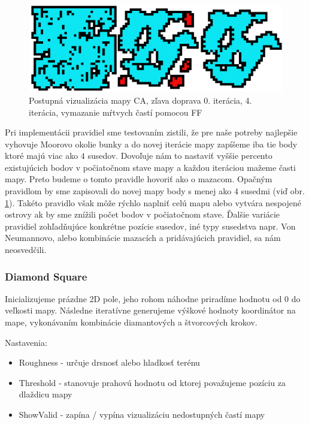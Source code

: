 \begin{figure} [b]
    \centering
    \includegraphics[width=0.75\linewidth]{obrazky-figures/ca.png}
    \caption{Postupná vizualizácia mapy CA, zľava doprava 0. iterácia, 4. iterácia, vymazanie mŕtvych častí pomocou FF}
    \label{fig:ca}
\end{figure}

Pri implementácii pravidiel sme testovaním zistili, že pre naše potreby najlepšie vyhovuje Moorovo okolie bunky a do novej iterácie mapy zapíšeme iba tie body ktoré majú viac ako $4$ susedov. Dovoľuje nám to nastaviť vyššie percento existujúcich bodov v počiatočnom stave mapy a každou iteráciou mažeme časti mapy. Preto budeme o tomto pravidle hovoriť ako o mazacom. 
Opačným pravidlom by sme zapisovali do novej mapy body s menej ako $4$ susedmi (viď obr. \ref{fig:ca}). Takéto pravidlo však môže rýchlo naplniť celú mapu alebo vytvára nespojené ostrovy ak by sme znížili počet bodov v počiatočnom stave. Ďalšie variácie pravidiel zohľadňujúce konkrétne pozície susedov, iné typy susedstva napr. Von Neumannovo, alebo kombinácie mazacích a pridávajúcich pravidiel, sa nám neosvedčili.

\subsubsection*{Diamond Square}

Inicializujeme prázdne 2D pole, jeho rohom náhodne priradíme hodnotu od 0 do veľkosti mapy. Následne iteratívne generujeme výškové hodnoty koordinátor na mape, vykonávaním kombinácie diamantových a štvorcových krokov. 

\noindent Nastavenia:

\begin{itemize}
    \item Roughness - určuje drsnosť alebo hladkosť terénu
    \item Threshold - stanovuje prahovú hodnotu od ktorej považujeme pozíciu za dlaždicu mapy
    \item ShowValid - zapína / vypína vizualizáciu nedostupných častí mapy
\end{itemize}

